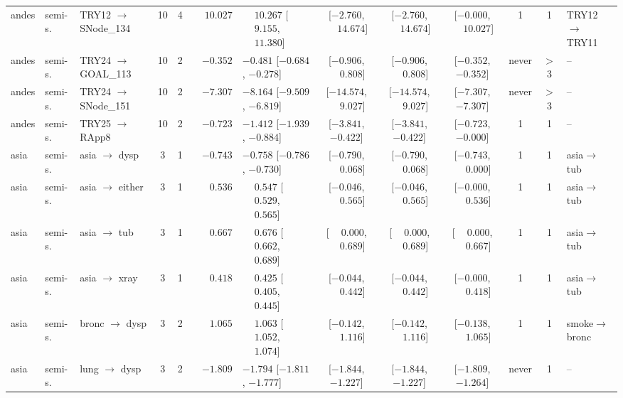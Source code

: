 \begin{landscape}
\begin{longtable}{@{}llp{2.15cm}ccrl cccc c l@{}}
andes & semi-s. & TRY12 $\to$ SNode\_\allowbreak{}134 & 10 & 4 & $\phantom{-}10.027$ & $\phantom{-}10.267$ [$\phantom{-}9.155$, $\phantom{-}11.380$] & [$-2.760$, $\phantom{-}14.674$] & [$-2.760$, $\phantom{-}14.674$] & [$-0.000$, $\phantom{-}10.027$] & 1 & 1 & TRY12$\to$TRY11 \\
andes & semi-s. & TRY24 $\to$ GOAL\_\allowbreak{}113 & 10 & 2 & $-0.352$ & $-0.481$ [$-0.684$, $-0.278$] & [$-0.906$, $\phantom{-}0.808$] & [$-0.906$, $\phantom{-}0.808$] & [$-0.352$, $-0.352$] & never & $>$3 & -- \\
andes & semi-s. & TRY24 $\to$ SNode\_\allowbreak{}151 & 10 & 2 & $-7.307$ & $-8.164$ [$-9.509$, $-6.819$] & [$-14.574$, $\phantom{-}9.027$] & [$-14.574$, $\phantom{-}9.027$] & [$-7.307$, $-7.307$] & never & $>$3 & -- \\
andes & semi-s. & TRY25 $\to$ RApp8 & 10 & 2 & $-0.723$ & $-1.412$ [$-1.939$, $-0.884$] & [$-3.841$, $-0.422$] & [$-3.841$, $-0.422$] & [$-0.723$, $-0.000$] & 1 & 1 & -- \\
asia & semi-s. & asia $\to$ dysp & 3 & 1 & $-0.743$ & $-0.758$ [$-0.786$, $-0.730$] & [$-0.790$, $\phantom{-}0.068$] & [$-0.790$, $\phantom{-}0.068$] & [$-0.743$, $\phantom{-}0.000$] & 1 & 1 & asia$\to$tub \\
asia & semi-s. & asia $\to$ either & 3 & 1 & $\phantom{-}0.536$ & $\phantom{-}0.547$ [$\phantom{-}0.529$, $\phantom{-}0.565$] & [$-0.046$, $\phantom{-}0.565$] & [$-0.046$, $\phantom{-}0.565$] & [$-0.000$, $\phantom{-}0.536$] & 1 & 1 & asia$\to$tub \\
asia & semi-s. & asia $\to$ tub & 3 & 1 & $\phantom{-}0.667$ & $\phantom{-}0.676$ [$\phantom{-}0.662$, $\phantom{-}0.689$] & [$\phantom{-}0.000$, $\phantom{-}0.689$] & [$\phantom{-}0.000$, $\phantom{-}0.689$] & [$\phantom{-}0.000$, $\phantom{-}0.667$] & 1 & 1 & asia$\to$tub \\
asia & semi-s. & asia $\to$ xray & 3 & 1 & $\phantom{-}0.418$ & $\phantom{-}0.425$ [$\phantom{-}0.405$, $\phantom{-}0.445$] & [$-0.044$, $\phantom{-}0.442$] & [$-0.044$, $\phantom{-}0.442$] & [$-0.000$, $\phantom{-}0.418$] & 1 & 1 & asia$\to$tub \\
asia & semi-s. & bronc $\to$ dysp & 3 & 2 & $\phantom{-}1.065$ & $\phantom{-}1.063$ [$\phantom{-}1.052$, $\phantom{-}1.074$] & [$-0.142$, $\phantom{-}1.116$] & [$-0.142$, $\phantom{-}1.116$] & [$-0.138$, $\phantom{-}1.065$] & 1 & 1 & smoke$\to$bronc \\
asia & semi-s. & lung $\to$ dysp & 3 & 2 & $-1.809$ & $-1.794$ [$-1.811$, $-1.777$] & [$-1.844$, $-1.227$] & [$-1.844$, $-1.227$] & [$-1.809$, $-1.264$] & never & 1 & -- \\

\end{longtable}
\end{landscape}
